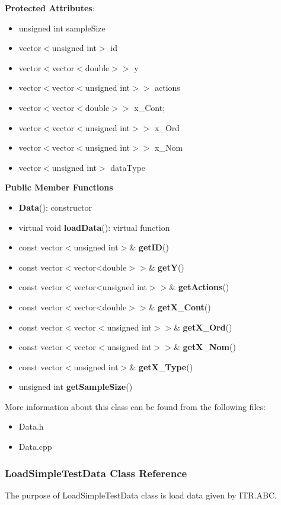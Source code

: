 \documentclass{article}
\begin{document}
\textbf{Protected Attributes}:
\begin{itemize}
\item unsigned int sampleSize                               
\item vector$<$unsigned int$>$ id                               
\item vector$<$vector$<$double$>>$ y                               
\item vector$<$vector$<$unsigned int$>>$ actions              
\item vector$<$vector$<$double$>>$ x\_Cont;                          
\item vector$<$vector$<$unsigned int$>>$ x\_Ord                  
\item vector$<$vector$<$unsigned int$>>$ x\_Nom                    
\item vector$<$unsigned int$>$ dataType
\end{itemize}

\textbf{Public Member Functions}
\begin{itemize}
\item \textbf{Data}(): constructor
\item virtual void \textbf{loadData}(): virtual function
\item const vector$<$unsigned int$>$\& \textbf{getID}()
\item const vector$<$vector<double$>>$\& \textbf{getY}()
\item const vector$<$vector<unsigned int$>>$\& \textbf{getActions}()
\item const vector$<$vector<double$>>$\& \textbf{getX}\_\textbf{Cont}()
\item const vector$<$vector$<$unsigned int$>>$\& \textbf{getX}\_\textbf{Ord}()
\item const vector$<$vector$<$unsigned int$>>$\& \textbf{getX}\_\textbf{Nom}()
\item const vector$<$unsigned int$>$\& \textbf{getX}\_\textbf{Type}()
\item unsigned int \textbf{getSampleSize}()
\end{itemize}


More information about this class can be found from the following files:
\begin{itemize}
\item Data.h
\item Data.cpp
\end{itemize}

\subsubsection{LoadSimpleTestData Class Reference}
The purpose of LoadSimpleTestData class is load data given by ITR.ABC.
\end{document}
